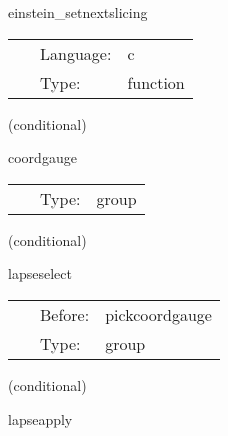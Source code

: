 \documentclass{article}
\begin{document}
\vspace{5mm}


\hspace{5mm} einstein\_setnextslicing 

\hspace{5mm}{\it identify the slicing for the next iteration } 


\hspace{5mm}

 \begin{tabular*}{160mm}{cll} 
~ & Language:  & c \\ 
~ & Type:  & function \\ 
\end{tabular*} 


\vspace{5mm}

   (conditional) 

\hspace{5mm} coordgauge 

\hspace{5mm}{\it coordinate gauge group } 


\hspace{5mm}

 \begin{tabular*}{160mm}{cll} 
~ & Type:  & group \\ 
\end{tabular*} 


\vspace{5mm}

   (conditional) 

\hspace{5mm} lapseselect 

\hspace{5mm}{\it lapse selection group } 


\hspace{5mm}

 \begin{tabular*}{160mm}{cll} 
~ & Before:  & pickcoordgauge \\ 
~ & Type:  & group \\ 
\end{tabular*} 


\vspace{5mm}

   (conditional) 

\hspace{5mm} lapseapply 
\end{document}
